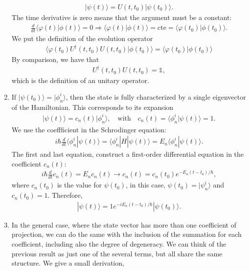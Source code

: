 \documentclass[letterpaper,11pt,twoside]{article}
\newcommand{\ket}[1]{|#1\rangle}
\newcommand{\braket}[1]{\langle#1\rangle}
\begin{document}
\begin{enumerate}[itemsep=0pt,topsep=0pt,label=\alph*)]
\begin{align}
    \ket{\psi(t)}=U(t,t_0)\ket{\psi(t_0)}.
  \end{align}
  The time derivative is zero means that the argument must be a constant:
  \begin{align*}
    \frac{d}{dt}\braket{\varphi(t)|\phi(t)}=0\Longrightarrow \braket{\varphi(t)|\phi(t)}=\text{cte}=\braket{\varphi(t_0)|\phi(t_0)}.
  \end{align*}
  We put the definition of the evolution operator
  \begin{align*}
    \braket{\varphi(t_0)U^\dagger(t,t_0)U(t,t_0)|\phi(t_0)}=\braket{\varphi(t_0)|\phi(t_0)}
  \end{align*}
  By comparison, we have that 
  \begin{align*}
    U^\dagger(t,t_0)U(t,t_0)=\mathds{1},
  \end{align*}
  which is the definition of an unitary operator.
  \item If $\ket{\psi(t_0)}=\ket{\phi_n^i}$, then the state is fully characterized by a single eigenvector of the Hamiltonian. This corresponds to its expansion
  \begin{align*}
    \ket{\psi(t)}=c_n(t)\ket{\phi_n^i},\quad\text{with}\quad c_n(t)=\braket{\phi_n^i|\psi(t)}=1.
  \end{align*} 
    We use the coeffficient in the Schrodinger equation:
    \begin{align*}
      i\hbar\frac{d}{dt}\braket{\phi_n^i|\psi(t)}=\braket{\phi_n^i|H|\psi(t)}=E_n\braket{\phi_n^i|\psi(t)}.
    \end{align*}
    The first and last equation, construct a first-order differential equation in the coefficient $c_n(t)$:
    \begin{align*}
      i\hbar\frac{d}{dt}c_n(t)=E_nc_n(t)\longrightarrow c_n(t)=c_n(t_0)e^{-E_n(t-t_0)/\hbar},
    \end{align*}
    where $c_n(t_0)$ is the value for $\psi(t_0)$, in this case, $\psi(t_0)=\ket{\psi_n^i}$ and $c_n(t_0)=1$. Therefore,
    \begin{align*}
      \ket{\psi(t)}=1e^{-iE_n(t-t_0)/\hbar}\ket{\psi(t_0)}.
    \end{align*}
  \item In the general case, where the state vector has more than one coefficient of projection, we can do the same with the inclusion of the summation for each coefficient, including 
  also the degree of degeneracy. We can think of the previous result as just one of the several terms, but all share the same structure.
  We give a small derivation,

\end{enumerate}
\end{document}
